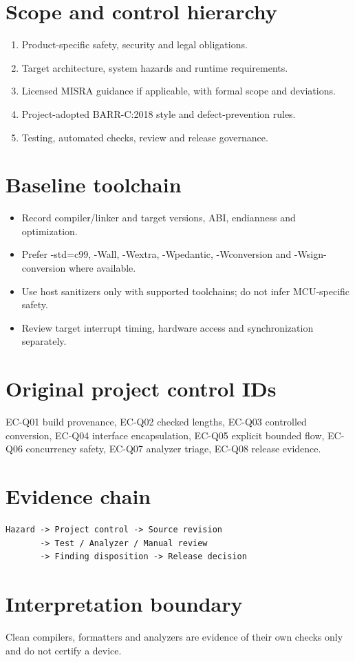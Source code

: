\documentclass[10pt,letterpaper]{article}
\begin{document}
\makedoctitle
\makedocsummary
\section{Scope and control hierarchy}
\begin{enumerate}
\item Product-specific safety, security and legal obligations.
\item Target architecture, system hazards and runtime requirements.
\item Licensed MISRA guidance if applicable, with formal scope and deviations.
\item Project-adopted BARR-C:2018 style and defect-prevention rules.
\item Testing, automated checks, review and release governance.
\end{enumerate}

\section{Baseline toolchain}
\begin{itemize}
\item Record compiler/linker and target versions, ABI, endianness and optimization.
\item Prefer -std=c99, -Wall, -Wextra, -Wpedantic, -Wconversion and -Wsign-conversion where available.
\item Use host sanitizers only with supported toolchains; do not infer MCU-specific safety.
\item Review target interrupt timing, hardware access and synchronization separately.
\end{itemize}

\section{Original project control IDs}
EC-Q01 build provenance, EC-Q02 checked lengths, EC-Q03 controlled conversion, EC-Q04 interface encapsulation, EC-Q05 explicit bounded flow, EC-Q06 concurrency safety, EC-Q07 analyzer triage, EC-Q08 release evidence.
\section{Evidence chain}
\begin{verbatim}
Hazard -> Project control -> Source revision
       -> Test / Analyzer / Manual review
       -> Finding disposition -> Release decision
\end{verbatim}
\section{Interpretation boundary}
Clean compilers, formatters and analyzers are evidence of their own checks only and do not certify a device.
\end{document}
